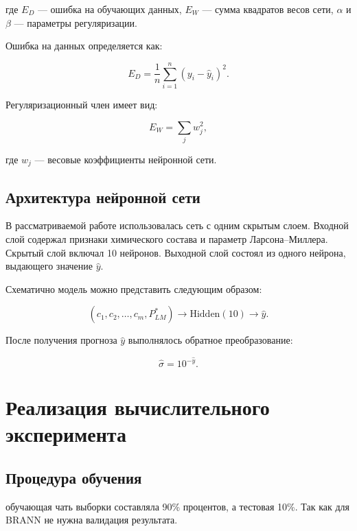 где $E_D$ --- ошибка на обучающих данных, 
$E_W$ --- сумма квадратов весов сети, 
$\alpha$ и $\beta$ --- параметры регуляризации.

Ошибка на данных определяется как:

\begin{equation}
E_D =
\frac{1}{n}
\sum_{i=1}^{n}
\left(
y_i - \hat{y}_i
\right)^2.
\end{equation}

Регуляризационный член имеет вид:

\begin{equation}
E_W =
\sum_{j}
w_j^2,
\end{equation}

где $w_j$ --- весовые коэффициенты нейронной сети.

\subsection{Архитектура нейронной сети}

В рассматриваемой работе использовалась сеть с одним скрытым слоем. 
Входной слой содержал признаки химического состава и параметр 
Ларсона--Миллера. Скрытый слой включал 10 нейронов. 
Выходной слой состоял из одного нейрона, выдающего значение $\hat{y}$.

Схематично модель можно представить следующим образом:

\begin{equation}
\left(
c_1, c_2, \ldots, c_m, P_{LM}^{*}
\right)
\rightarrow
\mathrm{Hidden}(10)
\rightarrow
\hat{y}.
\end{equation}

После получения прогноза $\hat{y}$ выполнялось обратное преобразование:

\begin{equation}
\hat{\sigma} =
10^{-\hat{y}}.
\end{equation}

\section{Реализация вычислительного эксперимента}

\subsection{Процедура обучения}

обучающая чать выборки составляла 90\% процентов, а тестовая 10\%. 
Так как для BRANN не нужна валидация результата.

